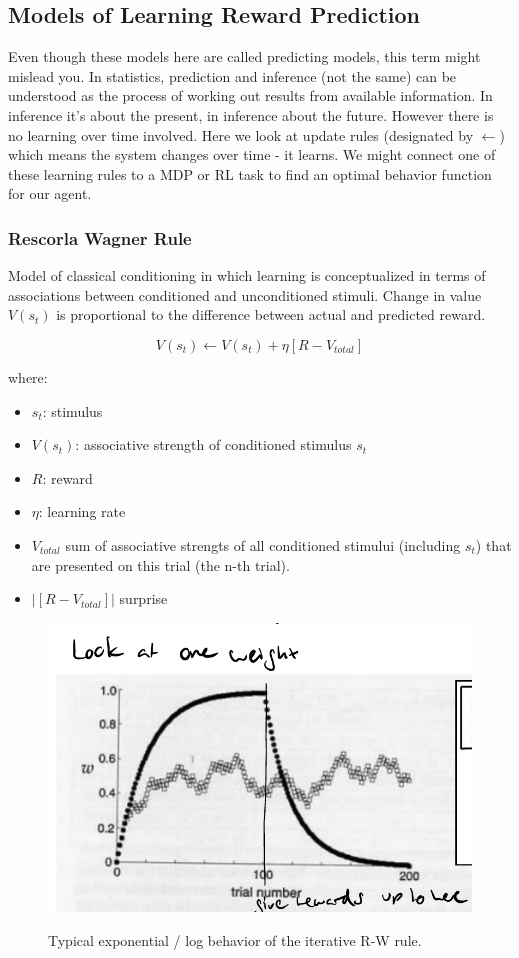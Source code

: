 \documentclass[main]{subfiles}
\begin{document}
\subsection{Models of Learning Reward Prediction}
Even though these models here are called predicting models, this term might mislead you. In statistics, prediction and inference (not the same) can be understood as the process of working out results from available information. In inference it's about the present, in inference about the future. However there is no learning over time involved. Here we look at update rules (designated by $\leftarrow$) which means the system changes over time - it learns. We might connect one of these learning rules to a MDP or RL task to find an optimal behavior function for our agent.

\subsubsection{Rescorla Wagner Rule}
Model of classical conditioning in which learning is conceptualized in terms of associations between conditioned and unconditioned stimuli. Change in value $V(s_t)$ is proportional to the difference between actual and predicted reward.

\begin{equation}
    V(s_{t}) \leftarrow V(s_t) + \eta[R- V_{total}]
\end{equation}

where:

\begin{itemize}
    \item $s_t$: stimulus
    \item $V(s_t)$: associative strength of conditioned stimulus $s_t$
    \item $R$: reward
    \item $\eta$: learning rate
    \item $V_{total}$ sum of associative strengts of all conditioned stimului (including $s_t$) that are presented on this trial (the n-th trial).
    \item $|[R- V_{total}]|$ surprise
\end{itemize}

\begin{figure}[H]
	\centering
	\includegraphics[width=0.9\linewidth]{08_ReinforcementLearning/figures/rw-rule.png}
	\label{fig:rw-rule}
	\caption{Typical exponential / log behavior of the iterative R-W rule.}
\end{figure}
\end{document}
